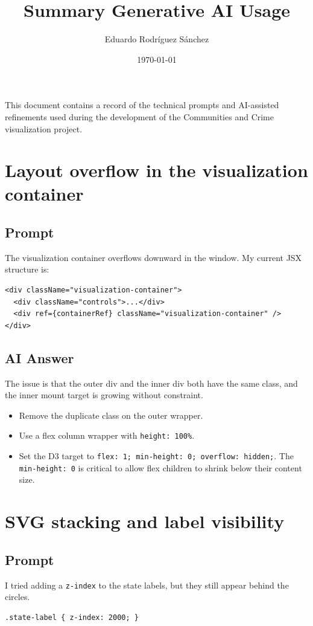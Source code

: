 \documentclass[11pt]{article}
\title{Summary Generative AI Usage}
\author{Eduardo Rodríguez Sánchez}
\date{\today}
\begin{document}
\maketitle

This document contains a record of the technical prompts and AI-assisted refinements used during the development of the Communities and Crime visualization project.

\section{Layout overflow in the visualization container}
\subsection*{Prompt}
The visualization container overflows downward in the window. My current JSX structure is:
\begin{Verbatim}[fontsize=\small]
<div className="visualization-container">
  <div className="controls">...</div>
  <div ref={containerRef} className="visualization-container" />
</div>
\end{Verbatim}

\subsection*{AI Answer}
The issue is that the outer div and the inner div both have the same class, and the inner mount target is growing without constraint. 
\begin{itemize}[leftmargin=*]
  \item Remove the duplicate class on the outer wrapper.
  \item Use a flex column wrapper with \texttt{height: 100\%}.
  \item Set the D3 target to \texttt{flex: 1; min-height: 0; overflow: hidden;}. The \texttt{min-height: 0} is critical to allow flex children to shrink below their content size.
\end{itemize}

\section{SVG stacking and label visibility}
\subsection*{Prompt}
I tried adding a \texttt{z-index} to the state labels, but they still appear behind the circles.
\begin{Verbatim}[fontsize=\small]
.state-label { z-index: 2000; }
\end{Verbatim}
\end{document}
